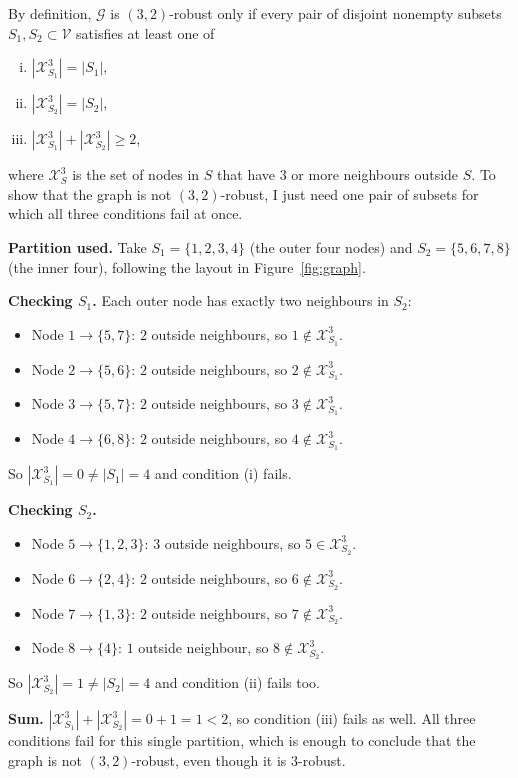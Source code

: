 \documentclass[a4paper, 11pt]{article}
\begin{document}
\begin{solution}
By definition, $\mathcal{G}$ is $(3,2)$-robust only if every pair of disjoint nonempty subsets $S_1,S_2\subset\mathcal{V}$ satisfies at least one of
\begin{enumerate}[(i)]
    \item $|\mathcal{X}_{S_1}^3|=|S_1|$,
    \item $|\mathcal{X}_{S_2}^3|=|S_2|$,
    \item $|\mathcal{X}_{S_1}^3|+|\mathcal{X}_{S_2}^3|\ge 2$,
\end{enumerate}
where $\mathcal{X}_S^3$ is the set of nodes in $S$ that have $3$ or more neighbours outside $S$. To show that the graph is not $(3,2)$-robust, I just need one pair of subsets for which all three conditions fail at once.

\noindent\textbf{Partition used.} Take $S_1=\{1,2,3,4\}$ (the outer four nodes) and $S_2=\{5,6,7,8\}$ (the inner four), following the layout in Figure~\ref{fig:graph}.

\noindent\textbf{Checking $S_1$.} Each outer node has exactly two neighbours in $S_2$:
\begin{itemize}
    \item Node $1\to\{5,7\}$: $2$ outside neighbours, so $1\notin\mathcal{X}_{S_1}^3$.
    \item Node $2\to\{5,6\}$: $2$ outside neighbours, so $2\notin\mathcal{X}_{S_1}^3$.
    \item Node $3\to\{5,7\}$: $2$ outside neighbours, so $3\notin\mathcal{X}_{S_1}^3$.
    \item Node $4\to\{6,8\}$: $2$ outside neighbours, so $4\notin\mathcal{X}_{S_1}^3$.
\end{itemize}
So $|\mathcal{X}_{S_1}^3|=0\ne|S_1|=4$ and condition (i) fails.

\noindent\textbf{Checking $S_2$.}
\begin{itemize}
    \item Node $5\to\{1,2,3\}$: $3$ outside neighbours, so $5\in\mathcal{X}_{S_2}^3$.
    \item Node $6\to\{2,4\}$: $2$ outside neighbours, so $6\notin\mathcal{X}_{S_2}^3$.
    \item Node $7\to\{1,3\}$: $2$ outside neighbours, so $7\notin\mathcal{X}_{S_2}^3$.
    \item Node $8\to\{4\}$: $1$ outside neighbour, so $8\notin\mathcal{X}_{S_2}^3$.
\end{itemize}
So $|\mathcal{X}_{S_2}^3|=1\ne|S_2|=4$ and condition (ii) fails too.

\noindent\textbf{Sum.} $|\mathcal{X}_{S_1}^3|+|\mathcal{X}_{S_2}^3|=0+1=1<2$, so condition (iii) fails as well. All three conditions fail for this single partition, which is enough to conclude that the graph is not $(3,2)$-robust, even though it is $3$-robust.


\end{solution}
\end{document}
